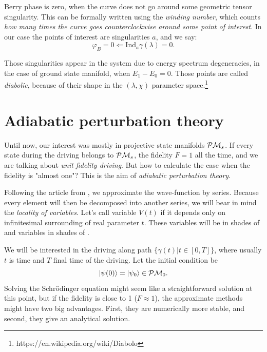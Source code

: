 Berry phase is zero, when the curve does not go around some geometric tensor singularity. This can be formally written using the \emph{winding number}, which counts \emph{how many times the curve goes counterclockwise around some point of interest}. In our case the points of interest are singularities $a$, and we say:
$$\varphi_B=0 \Leftarrow \mathrm{Ind}_a \gamma(\lambda)=0.$$

Those singularities appear in the system due to energy spectrum degeneracies, in the case of ground state manifold, when $E_1-E_0=0$. Those points are called \emph{diabolic}, because of their shape in the $(\lambda,\chi)$ parameter space.\footnote{https://en.wikipedia.org/wiki/Diabolo}









\newpage
\section{Adiabatic perturbation theory}
Until now, our interest was mostly in projective state manifolds $\mathcal{P}\mathcal{M}_s$. If every state during the driving belongs to $\mathcal{P}\mathcal{M}_s$, the fidelity $F=1$ all the time, and we are talking about \emph{unit fidelity driving}. But how to calculate the case when the fidelity is "almost one"? This is the aim of \emph{adiabatic perturbation theory}.


Following the article from \cite{Rigolin2008}, we approximate the wave-function by series. Because every element will then be decomposed into another series, we will bear in mind the \emph{locality of variables}. Let's call variable $V(t)$ \emph{} if it depends only on infinitesimal surrounding of real parameter $t$. These variables will be in shades of  and  variables in shades of .

We will be interested in the driving along path $\{\gamma(t)|t\in[0,T]\}$, where usually $t$ is time and $T$ final time of the driving. Let the initial condition be
\begin{equation}
    \ket{\psi(0)}=\ket{\psi_0}\in \mathcal{P}\mathcal{M}_0.
\end{equation}
Solving the Schr\"odinger equation might seem like a straightforward solution at this point, but if the fidelity is close to 1 ($F\approx 1$), the approximate methods might have two big advantages. First, they are numerically more stable, and second, they give an analytical solution.

